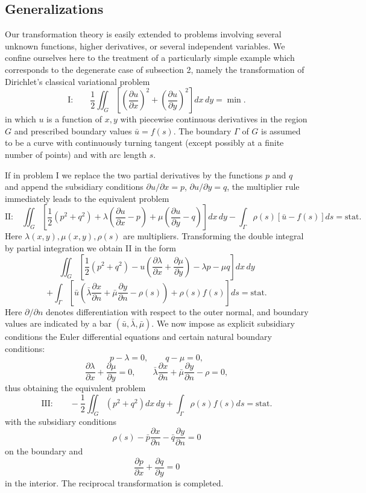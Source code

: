 \subsection{Generalizations}
Our transformation theory is easily extended to problems involving several unknown functions, higher derivatives, or several independent variables. We confine ourselves here to the treatment of a particularly simple example which corresponds to the degenerate case of subsection 2, namely the transformation of Dirichlet's classical variational problem
\[
\text{I:}\qquad \frac12\iint_G\left[\left(\frac{\partial u}{\partial x}\right)^2+\left(\frac{\partial u}{\partial y}\right)^2\right]dx\,dy=\min.
\]
in which $u$ is a function of $x,y$ with piecewise continuous derivatives in the region $G$ and prescribed boundary values $\bar u=f(s)$. The boundary $\Gamma$ of $G$ is assumed to be a curve with continuously turning tangent (except possibly at a finite number of points) and with arc length $s$.

If in problem I we replace the two partial derivatives by the functions $p$ and $q$ and append the subsidiary conditions $\partial u/\partial x=p$, $\partial u/\partial y=q$, the multiplier rule immediately leads to the equivalent problem
\[
\text{II:}\quad \iint_G\left[\frac12(p^2+q^2)+\lambda\left(\frac{\partial u}{\partial x}-p\right)+\mu\left(\frac{\partial u}{\partial y}-q\right)\right]dx\,dy
-\int_\Gamma \rho(s)[\bar u-f(s)]ds=\text{stat.}
\]
Here $\lambda(x,y),\mu(x,y),\rho(s)$ are multipliers. Transforming the double integral by partial integration we obtain II in the form
\[
\iint_G\left[\frac12(p^2+q^2)-u\left(\frac{\partial\lambda}{\partial x}+\frac{\partial\mu}{\partial y}\right)-\lambda p-\mu q\right]dx\,dy
\]
\[
+\int_\Gamma\left[\bar u\left(\bar\lambda\frac{\partial x}{\partial n}+\bar\mu\frac{\partial y}{\partial n}-\rho(s)\right)+\rho(s)f(s)\right]ds=\text{stat.}
\]
Here $\partial/\partial n$ denotes differentiation with respect to the outer normal, and boundary values are indicated by a bar $(\bar u,\bar\lambda,\bar\mu)$. We now impose as explicit subsidiary conditions the Euler differential equations and certain natural boundary conditions:
\[
p-\lambda=0,\qquad q-\mu=0,
\]
\[
\frac{\partial\lambda}{\partial x}+\frac{\partial\mu}{\partial y}=0,\qquad
\bar\lambda\frac{\partial x}{\partial n}+\bar\mu\frac{\partial y}{\partial n}-\rho=0,
\]
thus obtaining the equivalent problem
\[
\text{III:}\qquad -\frac12\iint_G(p^2+q^2)dx\,dy+\int_\Gamma\rho(s)f(s)ds=\text{stat.}
\]
with the subsidiary conditions
\[
\rho(s)-\bar p\frac{\partial x}{\partial n}-\bar q\frac{\partial y}{\partial n}=0
\]
on the boundary and
\[
\frac{\partial p}{\partial x}+\frac{\partial q}{\partial y}=0
\]
in the interior. The reciprocal transformation is completed.

